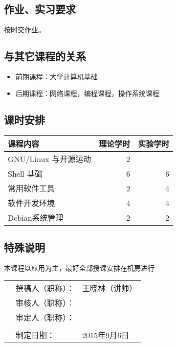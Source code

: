 \documentclass[12pt,a4paper]{article}
\begin{document}
\subsection{作业、实习要求}
按时交作业。

\subsection{与其它课程的关系}

\begin{itemize}
\item 前期课程：大学计算机基础
\item 后期课程：网络课程，编程课程，操作系统课程
\end{itemize}

\subsection{课时安排}

\begin{center}
  \begin{tabular}{lrr}
    \hline
    课程内容              &  理论学时  &  实验学时  \\
    \hline
    GNU/Linux 与开源运动  &         2  &            \\
    Shell 基础            &        6  &         6  \\
    常用软件工具          &         2  &         4  \\
    软件开发环境          &         4  &         4  \\
    Debian系统管理        &         2  &         2  \\
    \hline
  \end{tabular}
\end{center}

\subsection{特殊说明}
本课程以应用为主，最好全部授课安排在机房进行

\vspace{10em}
\begin{table}[h]
  \begin{tabular}{p{20em}ll}
    &撰稿人（职称）：&王晓林（讲师）\\
    &审核人（职称）：&\\
    &审定人（职称）：&\\
    &&\\
    &制定日期：&2015年9月6日\\
  \end{tabular}
\end{table}
\end{document}
